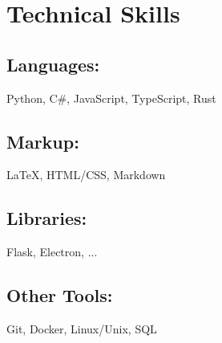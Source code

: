 \section*{Technical Skills}

\subsection*{Languages:} Python, C\#, JavaScript, TypeScript, Rust
\subsection*{Markup:} {\LaTeX}, HTML/CSS, Markdown
\subsection*{Libraries:} Flask, Electron, ...
\subsection*{Other Tools:} Git, Docker, Linux/Unix, SQL
